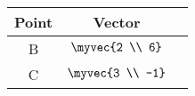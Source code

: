 \begin{tabular}[12pt]{ |c| c| c|} 
    \hline
    {Point} & {Vector} \\ 
    \hline
    B & $ \myvec{2 \\ 6} $  \\
    \hline
    C & $ \myvec{3 \\ -1} $   \\
    \hline  
    \end{tabular}